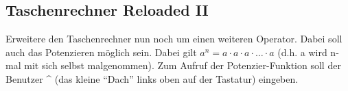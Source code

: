 \subsection{Taschenrechner Reloaded II }
Erweitere den Taschenrechner nun noch um einen weiteren Operator. Dabei soll auch das Potenzieren möglich sein. Dabei gilt $a^n=a\cdot a\cdot a \cdot\ldots\cdot a$ (d.h. a wird n-mal mit sich selbst malgenommen). Zum Aufruf der Potenzier-Funktion soll der Benutzer \^{} (das kleine "`Dach"' links oben auf der Tastatur) eingeben.

